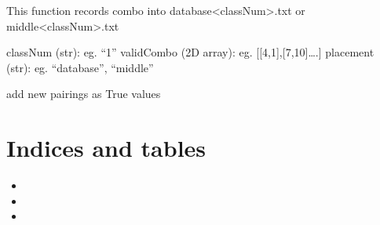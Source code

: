 \documentclass[letterpaper,10pt,english]{sphinxmanual}
\begin{document}
\begin{fulllineitems}
\label{\detokenize{pairing:pairing.recordValidCombo}}
\pysigstartsignatures
{}
\pysigstopsignatures
\sphinxAtStartPar
This function records combo into database\textless{}classNum\textgreater{}.txt or middle\textless{}classNum\textgreater{}.txt
\begin{description}
\sphinxAtStartPar
classNum (str): eg. “1”
validCombo (2D array): eg. {[}{[}4,1{]},{[}7,10{]}….{]}
placement (str): eg. “database”, “middle”

\sphinxAtStartPar
add new pairings as True values

\end{description}

\end{fulllineitems}


\sphinxstepscope
{}\label{\detokenize{window:module-window}}

\begin{fulllineitems}
\label{\detokenize{window:window.openClass}}
\pysigstartsignatures
{}
\pysigstopsignatures
\end{fulllineitems}


\begin{fulllineitems}
\label{\detokenize{window:window.openList}}
\pysigstartsignatures
{}
\pysigstopsignatures
\end{fulllineitems}



\chapter{Indices and tables}
\label{\detokenize{index:indices-and-tables}}\begin{itemize}
\item {} 
\sphinxAtStartPar
{}

\item {} 
\sphinxAtStartPar
{}

\item {} 
\sphinxAtStartPar
{}

\end{itemize}
\end{document}
